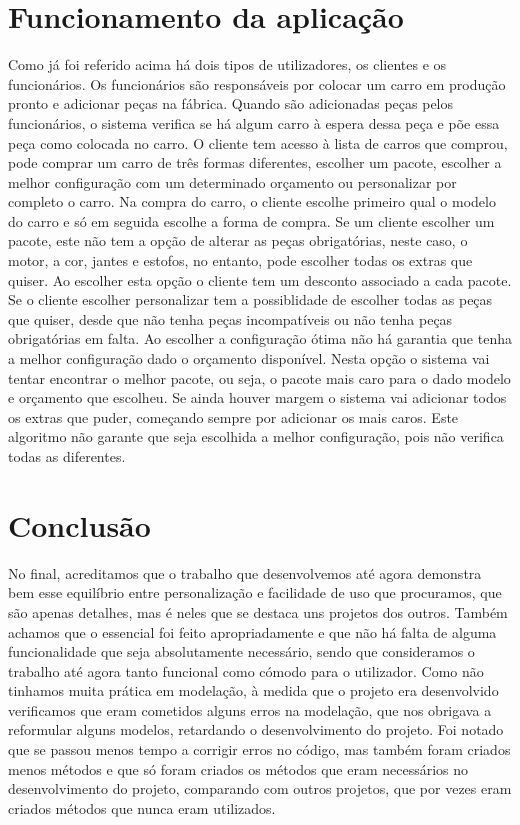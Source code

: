 \documentclass[10pt, a4paper]{report}
\begin{document}
\chapter{Funcionamento da aplicação}
Como já foi referido acima há dois tipos de utilizadores, os clientes e os funcionários. Os funcionários são responsáveis por colocar um carro em produção pronto e adicionar peças na fábrica. Quando são adicionadas peças pelos funcionários, o sistema verifica se há algum carro à espera dessa peça e põe essa peça como colocada no carro. O cliente tem acesso à lista de carros que comprou, pode comprar um carro de três formas diferentes, escolher um pacote, escolher a melhor configuração com um determinado orçamento ou personalizar por completo o carro. Na compra do carro, o cliente escolhe primeiro qual o modelo do carro e só em seguida escolhe a forma de compra. Se um cliente escolher um pacote, este não tem a opção de alterar as peças obrigatórias, neste caso, o motor, a cor, jantes e estofos, no entanto, pode escolher todas os extras que quiser. Ao escolher esta opção o cliente tem um desconto associado a cada pacote. Se o cliente escolher personalizar tem a possiblidade de escolher todas as peças que quiser, desde que não tenha peças incompatíveis ou não tenha peças obrigatórias em falta. Ao escolher a configuração ótima não há garantia que tenha a melhor configuração dado o orçamento disponível. Nesta opção o sistema vai tentar encontrar o melhor pacote, ou seja, o pacote mais caro para o dado modelo e orçamento que escolheu. Se ainda houver margem o sistema vai adicionar todos os extras que puder, começando sempre por adicionar os mais caros. Este algoritmo não garante que seja escolhida a melhor configuração, pois não verifica todas as diferentes.


\newpage
\chapter{Conclusão}\label{analise}
No final, acreditamos que o trabalho que desenvolvemos até agora demonstra bem esse equilíbrio entre personalização e facilidade de uso que procuramos, que são apenas detalhes, mas é neles que se destaca uns projetos dos outros. Também achamos que o essencial foi feito apropriadamente e que não há falta de alguma funcionalidade que seja absolutamente necessário, sendo que consideramos o trabalho até agora tanto funcional como cómodo para o utilizador. Como não tinhamos muita prática em modelação, à medida que o projeto era desenvolvido verificamos que eram cometidos alguns erros na modelação, que nos obrigava a reformular alguns modelos, retardando o desenvolvimento do projeto. Foi notado que se passou menos tempo a corrigir erros no código, mas também foram criados menos métodos e que só foram criados os métodos que eram necessários no desenvolvimento do projeto, comparando com outros projetos, que por vezes eram criados métodos que nunca eram utilizados.
\end{document}
